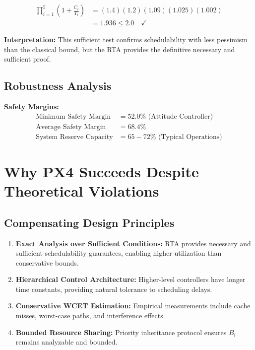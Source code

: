 \documentclass[12pt,a4paper]{article}
\begin{document}
\begin{align}
\prod_{i=1}^{5} \left(1 + \frac{C_i}{T_i}\right) &= (1.4)(1.2)(1.09)(1.025)(1.002) \\
&= 1.936 \leq 2.0 \quad \checkmark
\end{align}

\textbf{Interpretation:} This sufficient test confirms schedulability with less pessimism than the classical bound, but the RTA provides the definitive necessary and sufficient proof.

\subsection{Robustness Analysis}

\textbf{Safety Margins:}
\begin{align}
\text{Minimum Safety Margin} &= 52.0\% \text{ (Attitude Controller)} \\
\text{Average Safety Margin} &= 68.4\% \\
\text{System Reserve Capacity} &= 65-72\% \text{ (Typical Operations)}
\end{align}

\section{Why PX4 Succeeds Despite Theoretical Violations}

\subsection{Compensating Design Principles}

\begin{enumerate}
\item \textbf{Exact Analysis over Sufficient Conditions:} RTA provides necessary and sufficient schedulability guarantees, enabling higher utilization than conservative bounds.

\item \textbf{Hierarchical Control Architecture:} Higher-level controllers have longer time constants, providing natural tolerance to scheduling delays.

\item \textbf{Conservative WCET Estimation:} Empirical measurements include cache misses, worst-case paths, and interference effects.

\item \textbf{Bounded Resource Sharing:} Priority inheritance protocol ensures $B_i$ remains analyzable and bounded.
\end{enumerate}
\end{document}
